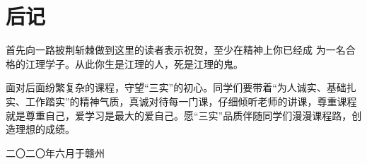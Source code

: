 \chapter{后记}
首先向一路披荆斩棘做到这里的读者表示祝贺，至少在精神上你已经成
为一名合格的江理学子。从此你生是江理的人，死是江理的鬼。

面对后面纷繁复杂的课程，守望“三实”的初心。同学们要带着“为人诚实、基础扎实、工作踏实”的精神气质，真诚对待每一门课，仔细倾听老师的讲课，尊重课程就是尊重自己，爱学习是最大的爱自己。愿“三实”品质伴随同学们漫漫课程路，创造理想的成绩。
\begin{flushright}
	二〇二〇年六月于赣州
\end{flushright}